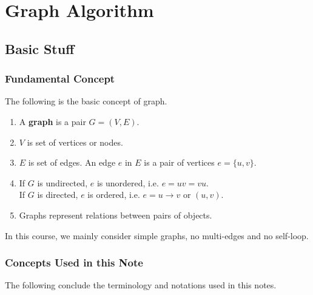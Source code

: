 \section{Graph Algorithm}

\subsection{Basic Stuff}

\subsubsection{Fundamental Concept}
The following is the basic concept of graph.
\begin{enumerate}
    \item A \textbf{graph} is a pair $G = (V,E)$.
    \item $V$ is set of vertices or nodes.
    \item $E$ is set of edges. An edge $e$ in $E$ is a pair of
        vertices $e = \{u,v\}$.
    \item If $G$ is undirected, $e$ is unordered, i.e. $e = uv = vu$.\\
        If $G$ is directed, $e$ is ordered, i.e. $e = u \rightarrow v$ or $(u,v)$.
    \item Graphs represent relations between pairs of objects.
\end{enumerate}

In this course, we mainly consider simple graphs,
no multi-edges and no self-loop.

\subsubsection{Concepts Used in this Note}
The following conclude the terminology and notations used
in this notes.

